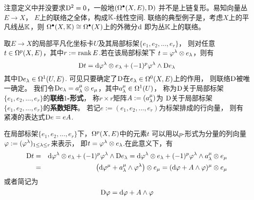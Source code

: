 
注意定义中并没要求$\mathrm{D}^2=0$，一般地$(\Omega^{\bullet}(X,E),\mathrm{D})$
并不是上链复形。易知向量丛$E\to X$，
$E$上的联络之全体，构成$\mathbb{K}$-线性空间.
联络的典型例子是，考虑$X$上的平凡线丛$\mathbb{K}$，则
$\Omega^{\bullet}(X,\mathbb{K})\cong\Omega^{\bullet}(X)$上的外微分$\mathrm{d}$
即为丛$\mathbb{K}$上的联络。\vs

取$E\to X$的局部平凡化坐标卡$U$及其局部标架$\{e_1,e_2,...,e_r\}$，
则对任意$t\in\Omega^p(X,E)$，其中$r:=\operatorname{rank} E$.若在该局部标架下
$t=\varphi^\lambda\otimes e_\lambda$，则有
$$
  \mathrm{D} t=
    \mathrm{d}\varphi^\lambda\otimes e_\lambda
   +(-1)^p\varphi^\lambda\wedge\mathrm{D} e_\lambda
$$
其中$\mathrm{D} e_\lambda\in\Omega^1(U,E)$.
可见只要确定了$\mathrm{D}$在$e_\lambda\in\Omega^0(X,E)$上的作用，
则联络$\mathrm{D}$被唯一确定。
我们令$\mathrm{D} e_\lambda=a_\lambda^\mu\otimes e_\mu$，其中$a_\lambda^\mu\in\Omega^1(U)$，
称为$\mathrm{D}$关于局部标架$\{e_1,e_2,...,e_r\}$的\textbf{联络$1$-形式}，
称$r\times r$矩阵$A:=(a^\mu_\lambda)$为
$\mathrm{D}$关于局部标架$\{e_1,e_2,...,e_r\}$的\textbf{系数矩阵}。
若记$e:=(e_1,e_2,...,e_r)$为标架排成的行向量，
则有紧凑的表达式$\mathrm{D} e=eA$.

在局部标架$\{e_1,e_2,...,e_r\}$下，$\Omega^p(X,E)$中的元素$t$
可以用以$p$-形式为分量的列向量$\varphi:=(\varphi^\lambda)_{1\leq\lambda\leq r}$来表示，
即$t=\varphi^\lambda\otimes e_\lambda$.在此意义下，有
\begin{eqnarray*}
     \mathrm{D} t
&=&
     \mathrm{d}\varphi^\lambda\otimes e_\lambda
    +(-1)^p\varphi^\lambda\wedge\mathrm{D} e_\lambda
 =
     \mathrm{d}\varphi^\lambda\otimes e_\lambda
    +(-1)^p\varphi^\lambda\wedge a_\lambda^\mu\otimes e_\mu\\
&=&
     \left(
       \mathrm{d}\varphi^\mu+a_\lambda^\mu\wedge\varphi^\lambda
     \right)\otimes e_\mu
 =
     (\mathrm{d}\varphi+A\wedge\varphi)^\mu\otimes e_\mu
\end{eqnarray*}
或者简记为
$$\mathrm{D}\varphi=\mathrm{d}\varphi+A\wedge\varphi$$


